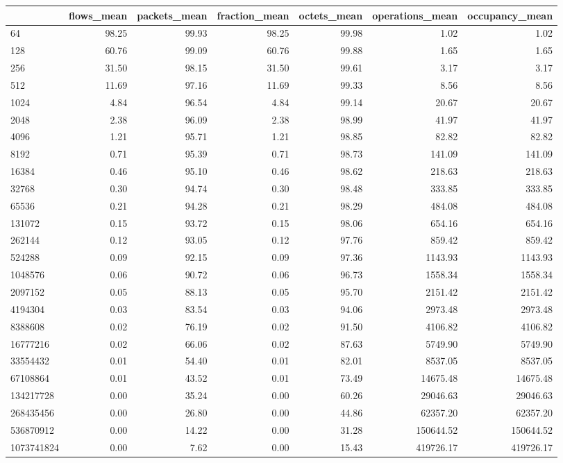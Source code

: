 \begin{tabular}{lrrrrrr}
\toprule
 & flows_mean & packets_mean & fraction_mean & octets_mean & operations_mean & occupancy_mean \\
\midrule
64 & 98.25 & 99.93 & 98.25 & 99.98 & 1.02 & 1.02 \\
128 & 60.76 & 99.09 & 60.76 & 99.88 & 1.65 & 1.65 \\
256 & 31.50 & 98.15 & 31.50 & 99.61 & 3.17 & 3.17 \\
512 & 11.69 & 97.16 & 11.69 & 99.33 & 8.56 & 8.56 \\
1024 & 4.84 & 96.54 & 4.84 & 99.14 & 20.67 & 20.67 \\
2048 & 2.38 & 96.09 & 2.38 & 98.99 & 41.97 & 41.97 \\
4096 & 1.21 & 95.71 & 1.21 & 98.85 & 82.82 & 82.82 \\
8192 & 0.71 & 95.39 & 0.71 & 98.73 & 141.09 & 141.09 \\
16384 & 0.46 & 95.10 & 0.46 & 98.62 & 218.63 & 218.63 \\
32768 & 0.30 & 94.74 & 0.30 & 98.48 & 333.85 & 333.85 \\
65536 & 0.21 & 94.28 & 0.21 & 98.29 & 484.08 & 484.08 \\
131072 & 0.15 & 93.72 & 0.15 & 98.06 & 654.16 & 654.16 \\
262144 & 0.12 & 93.05 & 0.12 & 97.76 & 859.42 & 859.42 \\
524288 & 0.09 & 92.15 & 0.09 & 97.36 & 1143.93 & 1143.93 \\
1048576 & 0.06 & 90.72 & 0.06 & 96.73 & 1558.34 & 1558.34 \\
2097152 & 0.05 & 88.13 & 0.05 & 95.70 & 2151.42 & 2151.42 \\
4194304 & 0.03 & 83.54 & 0.03 & 94.06 & 2973.48 & 2973.48 \\
8388608 & 0.02 & 76.19 & 0.02 & 91.50 & 4106.82 & 4106.82 \\
16777216 & 0.02 & 66.06 & 0.02 & 87.63 & 5749.90 & 5749.90 \\
33554432 & 0.01 & 54.40 & 0.01 & 82.01 & 8537.05 & 8537.05 \\
67108864 & 0.01 & 43.52 & 0.01 & 73.49 & 14675.48 & 14675.48 \\
134217728 & 0.00 & 35.24 & 0.00 & 60.26 & 29046.63 & 29046.63 \\
268435456 & 0.00 & 26.80 & 0.00 & 44.86 & 62357.20 & 62357.20 \\
536870912 & 0.00 & 14.22 & 0.00 & 31.28 & 150644.52 & 150644.52 \\
1073741824 & 0.00 & 7.62 & 0.00 & 15.43 & 419726.17 & 419726.17 \\
\bottomrule
\end{tabular}

